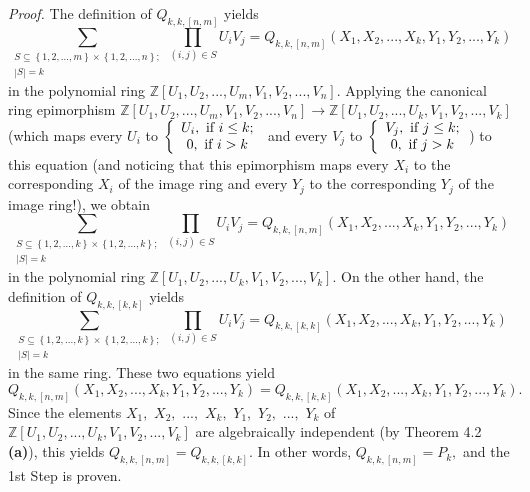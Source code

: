 \documentclass[12pt,final,notitlepage,onecolumn,german]{article}%
\begin{document}
\textit{Proof.} The definition of $Q_{k,k,\left[  n,m\right]  }$ yields
\[
\sum_{\substack{S\subseteq\left\{  1,2,...,m\right\}  \times\left\{
1,2,...,n\right\}  ;\\\left\vert S\right\vert =k}}\prod_{\left(  i,j\right)
\in S}U_{i}V_{j}=Q_{k,k,\left[  n,m\right]  }\left(  X_{1},X_{2}%
,...,X_{k},Y_{1},Y_{2},...,Y_{k}\right)
\]
in the polynomial ring $\mathbb{Z}\left[  U_{1},U_{2},...,U_{m},V_{1}%
,V_{2},...,V_{n}\right]  $. Applying the canonical ring epimorphism
$\mathbb{Z}\left[  U_{1},U_{2},...,U_{m},V_{1},V_{2},...,V_{n}\right]
\rightarrow\mathbb{Z}\left[  U_{1},U_{2},...,U_{k},V_{1},V_{2},...,V_{k}%
\right]  $ (which maps every $U_{i}$ to $\left\{
\begin{array}
[c]{c}%
U_{i},\text{ if }i\leq k;\\
0,\text{ if }i>k
\end{array}
\right.  $ and every $V_{j}$ to $\left\{
\begin{array}
[c]{c}%
V_{j},\text{ if }j\leq k;\\
0,\text{ if }j>k
\end{array}
\right.  $) to this equation (and noticing that this epimorphism maps every
$X_{i}$ to the corresponding $X_{i}$ of the image ring and every $Y_{j}$ to
the corresponding $Y_{j}$ of the image ring!), we obtain%
\[
\sum_{\substack{S\subseteq\left\{  1,2,...,k\right\}  \times\left\{
1,2,...,k\right\}  ;\\\left\vert S\right\vert =k}}\prod_{\left(  i,j\right)
\in S}U_{i}V_{j}=Q_{k,k,\left[  n,m\right]  }\left(  X_{1},X_{2}%
,...,X_{k},Y_{1},Y_{2},...,Y_{k}\right)
\]
in the polynomial ring $\mathbb{Z}\left[  U_{1},U_{2},...,U_{k},V_{1}%
,V_{2},...,V_{k}\right]  $. On the other hand, the definition of
$Q_{k,k,\left[  k,k\right]  }$ yields%
\[
\sum_{\substack{S\subseteq\left\{  1,2,...,k\right\}  \times\left\{
1,2,...,k\right\}  ;\\\left\vert S\right\vert =k}}\prod_{\left(  i,j\right)
\in S}U_{i}V_{j}=Q_{k,k,\left[  k,k\right]  }\left(  X_{1},X_{2}%
,...,X_{k},Y_{1},Y_{2},...,Y_{k}\right)
\]
in the same ring. These two equations yield%
\[
Q_{k,k,\left[  n,m\right]  }\left(  X_{1},X_{2},...,X_{k},Y_{1},Y_{2}%
,...,Y_{k}\right)  =Q_{k,k,\left[  k,k\right]  }\left(  X_{1},X_{2}%
,...,X_{k},Y_{1},Y_{2},...,Y_{k}\right)  .
\]
Since the elements $X_{1},$ $X_{2},$ $...,$ $X_{k},$ $Y_{1},$ $Y_{2},$ $...,$
$Y_{k}$ of $\mathbb{Z}\left[  U_{1},U_{2},...,U_{k},V_{1},V_{2},...,V_{k}%
\right]  $ are algebraically independent (by Theorem 4.2 \textbf{(a)}), this
yields $Q_{k,k,\left[  n,m\right]  }=Q_{k,k,\left[  k,k\right]  }.$ In other
words, $Q_{k,k,\left[  n,m\right]  }=P_{k},$ and the 1st Step is proven.
\end{document}
